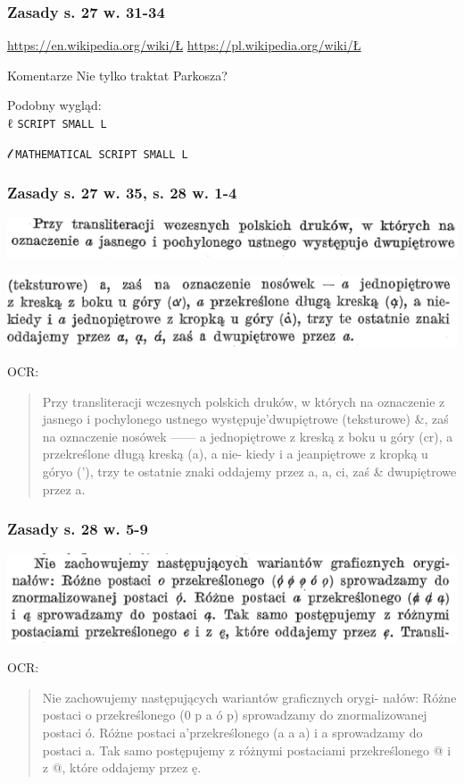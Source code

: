 \documentclass[pdfpagemode=UseNone]{beamer}
\begin{document}
\begin{frame}
  \frametitle{Zasady s. 27 w. 31-34}

  \url{https://en.wikipedia.org/wiki/Ł}
  \url{https://pl.wikipedia.org/wiki/Ł}
  
  \begin{block}{Komentarze}
      Nie tylko traktat Parkosza?

      Podobny wygląd:\\
      
      {ℓ} \texttt{SCRIPT SMALL L}

      {𝓁} \texttt{MATHEMATICAL SCRIPT SMALL L}
      
    \end{block}
\end{frame}


\begin{frame}
  \frametitle{Zasady s. 27 w. 35, s. 28 w. 1-4}
  \includegraphics[width=\hsize]{img/Zasady27-35}
  
  \includegraphics[width=\hsize]{img/Zasady28-1_4}

  OCR:
  \begin{quote}
Przy transliteracji wczesnych polskich druków, w których na
oznaczenie z jasnego i pochylonego ustnego występuje'dwupiętrowe
(teksturowe) \&, zaś na oznaczenie nosówek —— a jednopiętrowe
z kreską z boku u góry (cr), a przekreślone długą kreską (a), a nie-
kiedy i a jeanpiętrowe z kropką u góryo ('), trzy te ostatnie znaki
oddajemy przez a, a, ci, zaś \& dwupiętrowe przez a. 
\end{quote}
\end{frame}

\begin{frame}
  \frametitle{Zasady  s. 28 w. 5-9}
  \includegraphics[width=\hsize]{img/Zasady28-5_9}

  OCR:
  \begin{quote}
Nie zachowujemy następujących wariantów graficznych orygi-
nałów: Różne postaci o przekreślonego (0 p a ó p) sprowadzamy do
znormalizowanej postaci ó. Różne postaci a'przekreślonego (a a a)
i a sprowadzamy do postaci a. Tak samo postępujemy z różnymi
postaciami przekreślonego @ i z @, które oddajemy przez ę. 
  \end{quote}
\end{frame}
\end{document}
